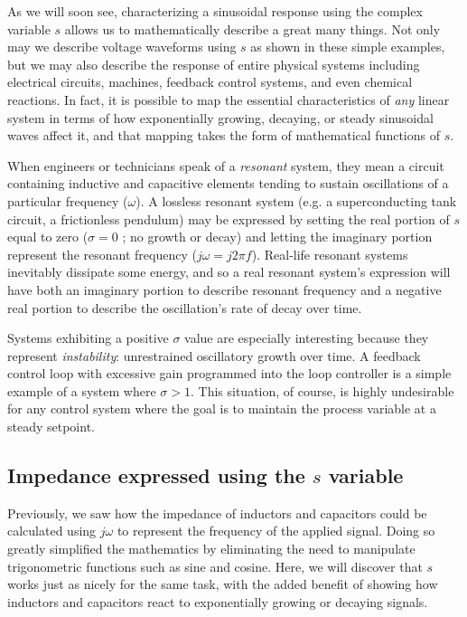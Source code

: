 As we will soon see, characterizing a sinusoidal response using the complex variable $s$ allows us to mathematically describe a great many things.  Not only may we describe voltage waveforms using $s$ as shown in these simple examples, but we may also describe the response of entire physical systems including electrical circuits, machines, feedback control systems, and even chemical reactions.  In fact, it is possible to map the essential characteristics of \textit{any} linear system in terms of how exponentially growing, decaying, or steady sinusoidal waves affect it, and that mapping takes the form of mathematical functions of $s$.

When engineers or technicians speak of a \textit{resonant} system, they mean a circuit containing inductive and capacitive elements tending to sustain oscillations of a particular frequency ($\omega$).  A lossless resonant system (e.g. a superconducting tank circuit, a frictionless pendulum) may be expressed by setting the real portion of $s$ equal to zero ($\sigma = 0$ ; no growth or decay) and letting the imaginary portion represent the resonant frequency ($j \omega = j 2 \pi f$).  Real-life resonant systems inevitably dissipate some energy, and so a real resonant system's expression will have both an imaginary portion to describe resonant frequency and a negative real portion to describe the oscillation's rate of decay over time.

Systems exhibiting a positive $\sigma$ value are especially interesting because they represent \textit{instability}: unrestrained oscillatory growth over time.  A feedback control loop with excessive gain programmed into the loop controller is a simple example of a system where $\sigma > 1$.  This situation, of course, is highly undesirable for any control system where the goal is to maintain the process variable at a steady setpoint.









\filbreak
\subsection{Impedance expressed using the $s$ variable}

Previously, we saw how the impedance of inductors and capacitors could be calculated using $j \omega$ to represent the frequency of the applied signal.  Doing so greatly simplified the mathematics by eliminating the need to manipulate trigonometric functions such as sine and cosine.  Here, we will discover that $s$ works just as nicely for the same task, with the added benefit of showing how inductors and capacitors react to exponentially growing or decaying signals.  

